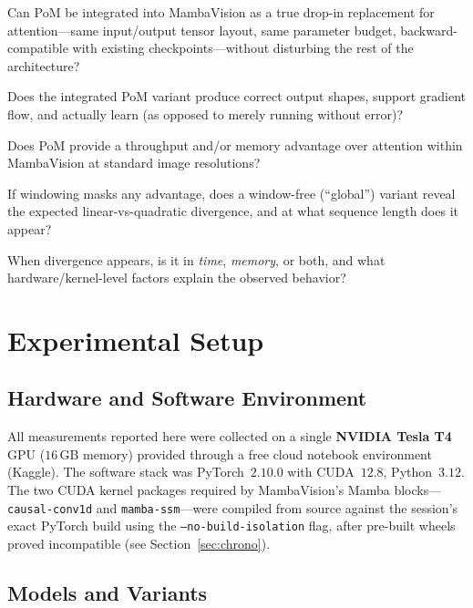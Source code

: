 \documentclass[11pt,a4paper]{article}
\begin{document}
\begin{description}[leftmargin=1.5em, style=nextline]
    \item[RQ1 (Integration).] Can PoM be integrated into MambaVision as a true drop-in replacement for attention---same input/output tensor layout, same parameter budget, backward-compatible with existing checkpoints---without disturbing the rest of the architecture?
    \item[RQ2 (Correctness).] Does the integrated PoM variant produce correct output shapes, support gradient flow, and actually learn (as opposed to merely running without error)?
    \item[RQ3 (Efficiency, as first posed).] Does PoM provide a throughput and/or memory advantage over attention within MambaVision at standard image resolutions?
    \item[RQ4 (Efficiency, refined).] If windowing masks any advantage, does a window-free (``global'') variant reveal the expected linear-vs-quadratic divergence, and at what sequence length does it appear?
    \item[RQ5 (Mechanism).] When divergence appears, is it in \emph{time}, \emph{memory}, or both, and what hardware/kernel-level factors explain the observed behavior?
\end{description}

\section{Experimental Setup}

\subsection{Hardware and Software Environment}

All measurements reported here were collected on a single \textbf{NVIDIA Tesla T4} GPU ($16$\,GB memory) provided through a free cloud notebook environment (Kaggle). The software stack was PyTorch~$2.10.0$ with CUDA~$12.8$, Python~$3.12$. The two CUDA kernel packages required by MambaVision's Mamba blocks---\texttt{causal-conv1d} and \texttt{mamba-ssm}---were compiled from source against the session's exact PyTorch build using the \texttt{--no-build-isolation} flag, after pre-built wheels proved incompatible (see Section~\ref{sec:chrono}).

\subsection{Models and Variants}
\end{document}
